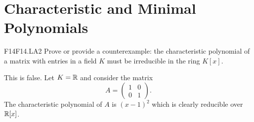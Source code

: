 \documentclass[../AlgebraQualSolutions.tex]{subfiles}
\begin{document}
\section{Characteristic and Minimal Polynomials}

\begin{prob}{F14}{F14.LA2}
	Prove or provide a counterexample: the characteristic polynomial of a matrix with entries in a field $K$ must be irreducible in the ring $K[x]$.
\end{prob}

\begin{solution}
	This is false. Let $K = \mathbb{R}$ and consider the matrix
		\[A = \begin{pmatrix} 1 & 0 \\ 0 & 1 \end{pmatrix}. \]
	The characteristic polynomial of $A$ is $(x-1)^2$ which is clearly reducible over $\mathbb{R}[x]$.
\end{solution}
\end{document}
